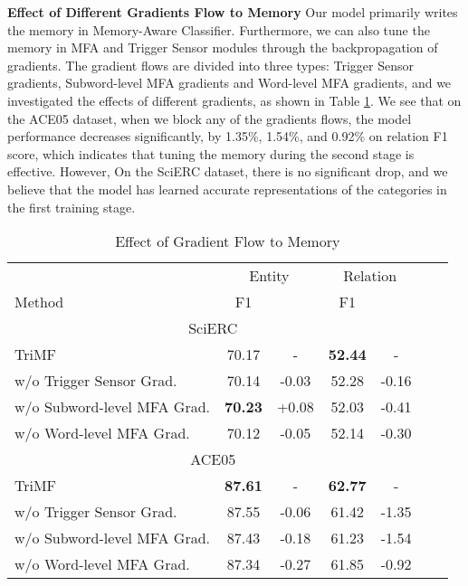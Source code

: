 \documentclass[sigconf]{acmart}
\begin{document}
\noindent\textbf{Effect of Different Gradients Flow to Memory}
Our model primarily writes the memory in Memory-Aware Classifier. Furthermore, we can also tune the memory in MFA and Trigger Sensor modules through the backpropagation of gradients. The gradient flows are divided into three types: Trigger Sensor gradients, Subword-level MFA gradients and  Word-level MFA gradients, and we investigated the effects of different gradients, as shown in Table \ref{tab:as_grad}. We see that on the ACE05 dataset, when we block any of the gradients flows, the model performance decreases significantly, by 1.35\%, 1.54\%, and 0.92\% on relation F1 score, which indicates that tuning the memory during the second stage is effective. However, On the SciERC dataset, there is no significant drop, and we believe that the model has learned accurate representations of the categories in the first training stage.


\begin{table}
\small

  \begin{tabular}{@{}lcccccc@{}}
  \toprule
 	& \multicolumn{2}{c}{Entity} & \multicolumn{2}{c}{Relation} \\ 
 	\cmidrule(lr){2-3} \cmidrule(lr){4-5}
 	Method & F1 &  & F1 &  \\ \midrule
 	\multicolumn{5}{c}{SciERC} \\ \midrule
 	TriMF  & 70.17 & - & \textbf{52.44} & - \\
 	 \quad w/o Trigger Sensor Grad.  & 70.14 & -0.03 & 52.28 & -0.16 \\
 	 \quad w/o Subword-level MFA Grad.  & \textbf{70.23} & +0.08 & 52.03 & -0.41 \\
 	 \quad w/o Word-level MFA Grad.  & 70.12 & -0.05 & 52.14 & -0.30\\ \midrule
  	\multicolumn{5}{c}{ACE05} \\ \midrule
 	TriMF  & \textbf{87.61} & - & \textbf{62.77} & - \\
 	 \quad w/o Trigger Sensor Grad.  & 87.55 & -0.06 & 61.42 & -1.35 \\
 	 \quad w/o Subword-level MFA Grad.  & 87.43 & -0.18 & 61.23 & -1.54 \\
 	\quad w/o Word-level MFA Grad.  & 87.34 & -0.27 & 61.85 & -0.92\\
   \bottomrule
 \end{tabular}
 \caption{Effect of Gradient Flow to Memory}
   \label{tab:as_grad}
\end{table}
\end{document}

